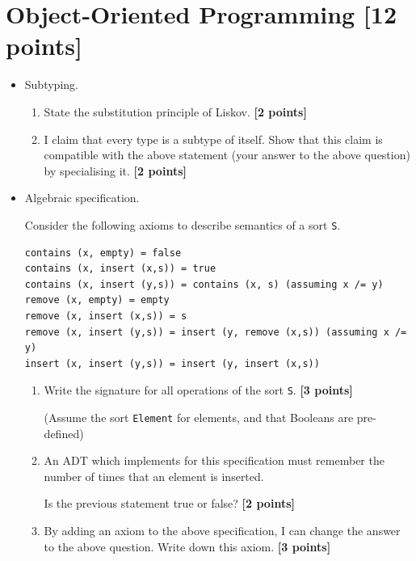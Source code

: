 \documentclass{article}
\begin{document}
\newpage
\section{Object-Oriented Programming [12 points]}

\begin{itemize}

\item Subtyping.

\begin{enumerate}
\item State the substitution principle of Liskov. \hfill{\textbf{[2 points]}}

\item I claim that every type is a subtype of itself. Show that this claim is compatible with 
  the above statement (your answer to the above question) by specialising it. \hfill{\textbf{[2 points]}}
\end{enumerate}

\item Algebraic specification.

Consider the following axioms to describe semantics of a sort
\verb!S!.

\begin{verbatim}
contains (x, empty) = false
contains (x, insert (x,s)) = true
contains (x, insert (y,s)) = contains (x, s) (assuming x /= y)
remove (x, empty) = empty
remove (x, insert (x,s)) = s
remove (x, insert (y,s)) = insert (y, remove (x,s)) (assuming x /= y)
insert (x, insert (y,s)) = insert (y, insert (x,s))
\end{verbatim}

\begin{enumerate}
\item 
Write the signature for all operations of the sort \verb!S!. \hfill{\textbf{[3 points]}}

(Assume the sort \verb!Element! for elements, and that Booleans are
pre-defined) 

\item An ADT which implements for this specification must remember the
  number of times that an element is inserted.

Is the previous statement true or false? \hfill{\textbf{[2 points]}}

\item 
By adding an axiom to the above specification, I can change the
answer to the above question. Write down this axiom. \hfill{\textbf{[3 points]}}
\end{enumerate}


\end{itemize}
\end{document}
